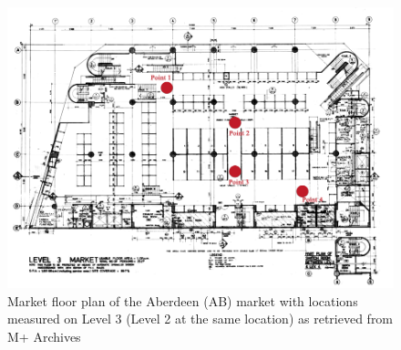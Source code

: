 \documentclass[preprint,12pt]{elsarticle}
\begin{document}
    \begin{figure}[h!]
        \centering
        \includegraphics[width=0.55\linewidth]{013669_001(cy_update).jpg}
        \caption{Market floor plan of the Aberdeen (AB) market with locations measured on Level 3 (Level 2 at the same location) as retrieved from M+ Archives\cite{dennis_lau__ng_chun_man_architects__engineers_hk_limited_level_1979}}
        \label{fig:ab-floorplan}
    \end{figure}
    
\end{document}
